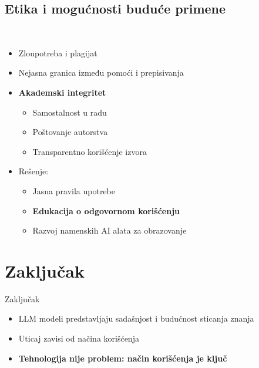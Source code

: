 \documentclass{beamer}
\newcommand{\frametitlesection}{
    \raggedright
    \insertsubsectionhead\\[-2pt]
    {\small \insertsectionhead}
}
\begin{document}
\subsection{Etika i mogućnosti buduće primene}

\begin{frame}{\frametitlesection}
\begin{itemize}
    \item Zloupotreba i plagijat
    \item Nejasna granica između pomoći i prepisivanja
    \item \textbf{Akademski integritet}
    \begin{itemize}
        \item Samostalnost u radu
        \item Poštovanje autorstva
        \item Transparentno korišćenje izvora
    \end{itemize}
    \item Rešenje:
    \begin{itemize}
        \item Jasna pravila upotrebe
        \item \textbf{Edukacija o odgovornom korišćenju}
        \item Razvoj namenskih AI alata za obrazovanje 
    \end{itemize}
\end{itemize}
\end{frame}

\section{Zaključak}

\begin{frame}{Zaključak}
\begin{itemize}
    \item LLM modeli predstavljaju sadašnjost i budućnost sticanja znanja
    \item Uticaj zavisi od načina korišćenja
    \item \textbf{Tehnologija nije problem: način korišćenja je ključ} 
\end{itemize}
\end{frame}
\end{document}
